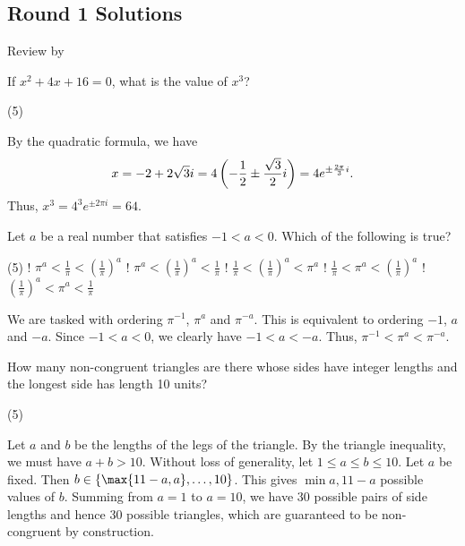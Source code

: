 \subsection{Round 1 Solutions}\label{S::2024-J-1}

\begin{resources}
    Review by 
\end{resources}

\begin{question}[D]\label{Q::2024-J-1-1}
    If $x^2 + 4x + 16 = 0$, what is the value of $x^3$?
    \begin{tasks}(5)
    \end{tasks}
\end{question}
\begin{solution*}
    By the quadratic formula, we have \[x = -2 + 2\sqrt3 i = 4\left( -\frac12 \pm \frac{\sqrt3}{2} i \right) = 4e^{\pm\frac{2\pi}{3} i}.\] Thus, $x^3 = 4^3 e^{\pm 2\pi i} = 64$.
\end{solution*}

\begin{question}[D]\label{Q::2024-J-1-2}
    Let $a$ be a real number that satisfies $-1 < a < 0$. Which of the following is true?
    \begin{tasks}(5)
        \task! $\pi^a < \frac1\pi < (\frac1\pi)^a$
        \task! $\pi^a < (\frac1\pi)^a < \frac1\pi$
        \task! $\frac1\pi < (\frac1\pi)^a < \pi^a$
        \task! $\frac1\pi < \pi^a < (\frac1\pi)^a$
        \task! $(\frac1\pi)^a < \pi^a < \frac1\pi$
    \end{tasks}
\end{question}
\begin{solution*}
    We are tasked with ordering $\pi^{-1}$, $\pi^{a}$ and $\pi^{-a}$. This is equivalent to ordering $-1$, $a$ and $-a$. Since $-1 < a < 0$, we clearly have $-1 < a < -a$. Thus, $\pi^{-1} < \pi^a < \pi^{-a}$.
\end{solution*}

\begin{question}[B]\label{Q::2024-J-1-3}
    How many non-congruent triangles are there whose sides have integer lengths and the longest side has length 10 units?
    \begin{tasks}(5)
    \end{tasks}
\end{question}
\begin{solution*}
    Let $a$ and $b$ be the lengths of the legs of the triangle. By the triangle inequality, we must have $a + b > 10$. Without loss of generality, let $1 \leq a \leq b \leq 10$. Let $a$ be fixed. Then $b \in \bc{\max{11-a, a}, \ldots, 10}$. This gives $\min{a, 11-a}$ possible values of $b$. Summing from $a = 1$ to $a = 10$, we have 30 possible pairs of side lengths and hence 30 possible triangles, which are guaranteed to be non-congruent by construction.
\end{solution*}

